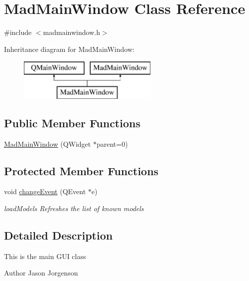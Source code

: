 \hypertarget{class_mad_main_window}{\section{Mad\-Main\-Window Class Reference}
\label{class_mad_main_window}
}


{\ttfamily \#include $<$madmainwindow.\-h$>$}

Inheritance diagram for Mad\-Main\-Window\-:\begin{figure}[H]
\begin{center}
\leavevmode
\includegraphics[height=2.000000cm]{class_mad_main_window}
\end{center}
\end{figure}
\subsection*{Public Member Functions}
\begin{DoxyCompactItemize}
\item 
\hyperlink{class_mad_main_window_adb4f90643637c6d6f89fb77c25ced55b}{Mad\-Main\-Window} (Q\-Widget $\ast$parent=0)
\end{DoxyCompactItemize}
\subsection*{Protected Member Functions}
\begin{DoxyCompactItemize}
\item 
void \hyperlink{class_mad_main_window_af9c57e0984b87146a1de895bc1a5b54b}{change\-Event} (Q\-Event $\ast$e)
\begin{DoxyCompactList}\small\item\em load\-Models Refreshes the list of known models \end{DoxyCompactList}\end{DoxyCompactItemize}


\subsection{Detailed Description}
This is the main G\-U\-I class \begin{DoxyAuthor}{Author}
Jason Jorgenson 
\end{DoxyAuthor}


